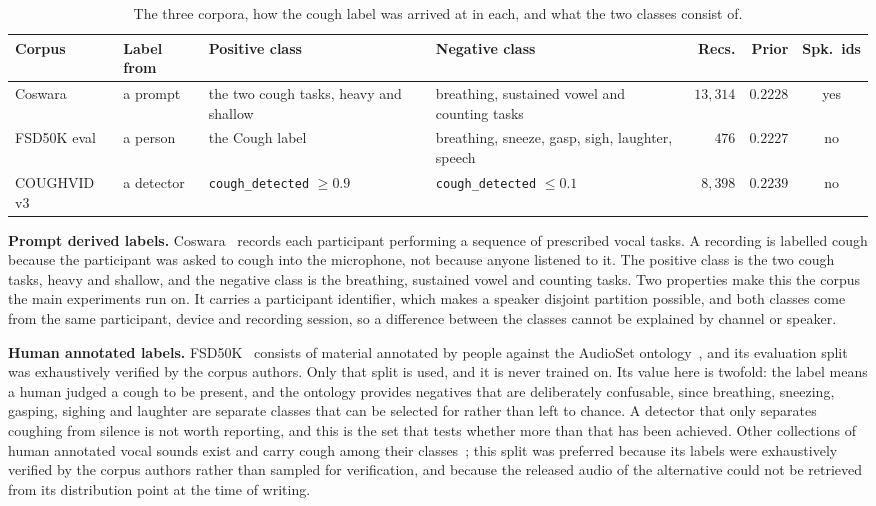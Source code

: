 \documentclass{ieeeaccess}
\begin{document}
\begin{table}[tbp]
\caption{The three corpora, how the cough label was arrived at in each, and what the two classes consist of.}\label{tab:corpora}
\small
\begin{tabular}{@{}lp{}p{}p{}rrc@{}}
\toprule
Corpus & Label from & Positive class & Negative class & Recs. & Prior & Spk.\ ids \\
\midrule
Coswara & a prompt & the two cough tasks, heavy and shallow & breathing, sustained vowel
  and counting tasks & $13{,}314$ & $0.2228$ & yes \\
\addlinespace
FSD50K eval & a person & the \textsf{Cough} label & breathing, sneeze, gasp, sigh,
  laughter, speech & $476$ & $0.2227$ & no \\
\addlinespace
COUGHVID v3 & a detector & \texttt{cough\_detected} $\geq 0.9$ &
  \texttt{cough\_detected} $\leq 0.1$ & $8{,}398$ & $0.2239$ & no \\
\bottomrule
\end{tabular}
\end{table}

\textbf{Prompt derived labels.} Coswara~\cite{coswara2020} records each participant
performing a sequence of prescribed vocal tasks. A recording is labelled cough because
the participant was asked to cough into the microphone, not because anyone listened to
it. The positive class is the two cough tasks, heavy and shallow, and the negative class
is the breathing, sustained vowel and counting tasks. Two properties make this the corpus
the main experiments run on. It carries a participant identifier, which makes a speaker
disjoint partition possible, and both classes come from the same participant, device and
recording session, so a difference between the classes cannot be explained by channel or
speaker.

\textbf{Human annotated labels.} FSD50K~\cite{fsd50k2022} consists of material annotated
by people against the AudioSet ontology~\cite{gemmeke2017}, and its evaluation split was
exhaustively verified by the corpus authors. Only that split is used, and it is never
trained on. Its value here is twofold: the label means a human judged a cough to be
present, and the ontology provides negatives that are deliberately confusable, since
breathing, sneezing, gasping, sighing and laughter are separate classes that can be
selected for rather than left to chance. A detector that only separates coughing from
silence is not worth reporting, and this is the set that tests whether more than that has
been achieved. Other collections of human annotated vocal sounds exist and carry cough
among their classes~\cite{vocalsound2022}; this split was preferred because its labels
were exhaustively verified by the corpus authors rather than sampled for verification, and
because the released audio of the alternative could not be retrieved from its distribution
point at the time of writing.
\end{document}
